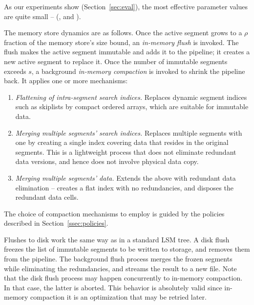 \noindent
As our experiments show (Section~\ref{sec:eval}), the most effective parameter values are quite small -- 
(, and ).

The memory store dynamics are as follows. 
Once the active segment grows to a $\rho$ fraction of the memory store's size bound, an \emph{in-memory flush} is invoked.
The flush makes the active segment  immutable and adds it to the pipeline; it creates a new active segment to replace it. 
Once the number of immutable segments exceeds $s$, a background \emph{in-memory compaction} is invoked to shrink
the pipeline back. It applies one or more mechanisms: 
\begin{enumerate}
\item {\em Flattening of intra-segment search indices.} Replaces dynamic segment indices such as skiplists by 
compact ordered arrays, which are suitable for immutable data. 
\item {\em Merging multiple segments' search indices.} 
Replaces multiple segments with one by creating a single index covering data that resides 
in the original segments. This is a lightweight process that does not eliminate redundant 
data versions, and hence does not involve physical data copy. 
\item  {\em Merging multiple segments' data.} Extends the above with redundant data elimination --
creates a flat index with no redundancies, and disposes the redundant data cells. 
\end{enumerate} 
The choice of compaction mechanisms to employ is guided by the policies described in Section~\ref{ssec:policies}.

Flushes to disk work the same way as in a standard LSM tree. A disk flush freezes the list of immutable segments 
to be written to storage, and removes them from the pipeline. The background flush process merges the frozen 
segments while eliminating the redundancies, and streams the result to a new file. Note that the disk flush process
may happen concurrently to in-memory compaction. In that case, the latter is aborted. This behavior is absolutely
valid since in-memory compaction it is an optimization that may be retried later.

